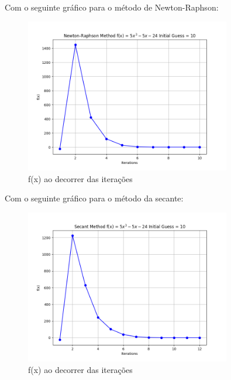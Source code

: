 \documentclass[12pt, a4paper]{article} %
\begin{document}
            Com o seguinte gr\'afico para o m\'etodo de Newton-Raphson:
            \begin{figure}[H]
                \centering
                \includegraphics[width=0.8\textwidth]{../images/grafic-ex-2.2-newton-raphson-method-10.png}
                \caption{f(x) ao decorrer das itera\c{c}\~oes}
            \end{figure}
            Com o seguinte gr\'afico para o m\'etodo da secante:
            \begin{figure}[H]
                \centering
                \includegraphics[width=0.8\textwidth]{../images/grafic-ex-2.2-secant-method-10.png}
                \caption{f(x) ao decorrer das itera\c{c}\~oes}
            \end{figure}
\end{document}

